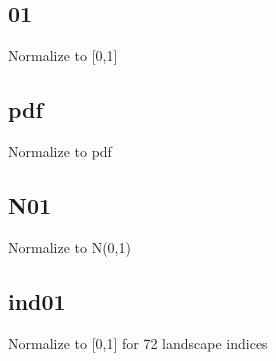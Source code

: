 \subsection{01}

Normalize to [0,1]

\subsection{pdf}

Normalize to pdf 

\subsection{N01}

Normalize to N(0,1)

\subsection{ind01}

Normalize to [0,1] for 72 landscape indices
